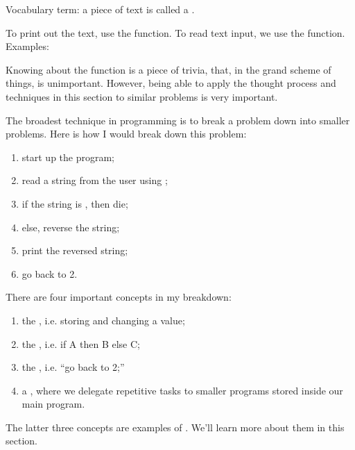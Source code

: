 Vocabulary term: a piece of text is called a .

To print out the text, use the  function. To read text
input, we use the  function. Examples:


Knowing about the function  is a piece of trivia, that,
in the grand scheme of things, is unimportant. However, being able to
apply the thought process and techniques in this section to similar
problems is very important.

The broadest technique in programming is to break a problem down into
smaller problems. Here is how I would break down this problem:

\begin{enumerate}
\item start up the program;
\item read a string from the user using ;
\item if the string is , then die;
\item else, reverse the string;
\item print the reversed string;
\item go back to 2.
\end{enumerate}

There are four important concepts in my breakdown:

\begin{enumerate}
\item the , i.e. storing and changing a value;
\item the , i.e. if A then B else C;
\item the , i.e. ``go back to 2;''
\item a , where we delegate repetitive tasks to
  smaller programs stored inside our main program.
\end{enumerate}

The latter three concepts are examples of . We'll learn more about them in this section.
